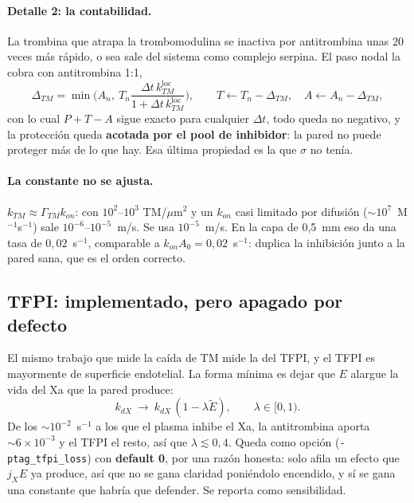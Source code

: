 \documentclass[11pt,a4paper]{article}
\begin{document}
\paragraph{Detalle 2: la contabilidad.} La trombina que atrapa la trombomodulina se
inactiva por antitrombina unas 20 veces más rápido, o sea sale del sistema como
complejo serpina. El paso nodal la cobra con antitrombina 1:1,
%
\begin{equation}
\Delta_{TM}=\min\!\Big(A_n,\ T_n\frac{\Delta t\,k_{TM}^{\mathrm{loc}}}{1+\Delta t\,k_{TM}^{\mathrm{loc}}}\Big),
\qquad T\leftarrow T_n-\Delta_{TM},\quad A\leftarrow A_n-\Delta_{TM},
\end{equation}
%
con lo cual $P+T-A$ sigue exacto para cualquier $\Delta t$, todo queda no negativo,
y la protección queda \textbf{acotada por el pool de inhibidor}: la pared no puede
proteger más de lo que hay. Esa última propiedad es la que $\sigma$ no tenía.

\paragraph{La constante no se ajusta.} $k_{TM}\approx\Gamma_{TM}k_{on}$: con
$10^2$--$10^3$ TM/$\mu$m$^2$ y un $k_{on}$ casi limitado por difusión
($\sim10^{7}$~M$^{-1}$s$^{-1}$) sale $10^{-6}$--$10^{-5}$~m/s. Se usa
$10^{-5}$~m/s. En la capa de 0{,}5~mm eso da una tasa de $0{,}02$~s$^{-1}$,
comparable a $k_{on}A_0=0{,}02$~s$^{-1}$: duplica la inhibición junto a la pared
sana, que es el orden correcto.

\subsection{TFPI: implementado, pero apagado por defecto}

El mismo trabajo que mide la caída de TM mide la del TFPI, y el TFPI es
mayormente de superficie endotelial. La forma mínima es dejar que $E$ alargue la
vida del Xa que la pared produce:
%
\begin{equation}
k_{dX}\ \longrightarrow\ k_{dX}\,(1-\lambda\tilde E),
\qquad \lambda\in[0,1).
\end{equation}
%
De los $\sim10^{-2}$~s$^{-1}$ a los que el plasma inhibe el Xa, la antitrombina
aporta $\sim6\times10^{-3}$ y el TFPI el resto, así que $\lambda\lesssim0{,}4$.
Queda como opción (\verb|-ptag_tfpi_loss|) con \textbf{default 0}, por una razón
honesta: solo afila un efecto que $j_XE$ ya produce, así que no se gana claridad
poniéndolo encendido, y sí se gana una constante que habría que defender. Se
reporta como sensibilidad.
\end{document}
